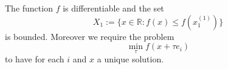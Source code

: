 \documentclass[17pt]{extarticle}
\begin{document}
The function $f$ is differentiable and the set 
$$
X_1:=\{x\in\mathbb{R} : f(x)\leq f(x^{(1)}_1)\}
$$
is bounded. Moreover we require the problem
$$
\min_{\tau}f(x+\tau e_i)
$$
to have for each $i$ and $x$ a unique solution.
\end{document}
